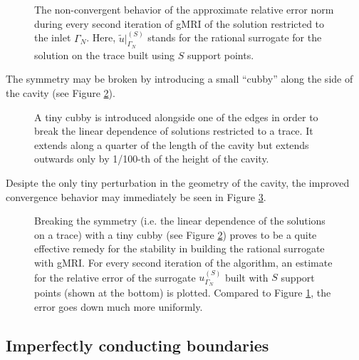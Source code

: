 \documentclass[11pt, a4paper]{article}
\begin{document}
\begin{figure}[ht]
    \centering
    
    \caption{The non-convergent behavior of the approximate relative error norm
    during every second iteration of \acrshort{gMRI} of the solution
    restricted to the inlet $\Gamma_N$. Here, $\tilde{u}|_{\Gamma_N}^{(S)}$ stands 
    for the rational surrogate for the solution on the trace built using $S$
    support points.}
    \label{fig:rectangular-cavity-trace-errornorm}
\end{figure}

The symmetry may be broken by introducing a small \enquote{cubby} along the side
of the cavity (see Figure \ref{fig:rectangular-cavity-cubby}). 

\begin{figure}[h]
    \centering
    
    \caption{A tiny cubby is introduced alongside one of the edges in order to
    break the linear dependence of solutions restricted to a trace. It extends
    along a quarter of the length of the cavity but extends outwards only by
    1/100-th of the height of the cavity.}
    \label{fig:rectangular-cavity-cubby}
\end{figure}

Desipte the only tiny perturbation in the geometry of the cavity, the improved
convergence behavior may immediately be seen in Figure \ref{fig:rectangular-cubby-trace-errornorm}.

\begin{figure}[ht]
    \centering
    
    \caption{Breaking the symmetry (i.e. the linear dependence of the solutions
    on a trace) with a tiny cubby (see Figure \ref{fig:rectangular-cavity-cubby})
    proves to be a quite effective remedy for the stability in building the
    rational surrogate with \acrshort{gMRI}. For every second iteration of the 
    algorithm, an estimate for the relative error of the surrogate $u_{\Gamma_N}^{(S)}$
    built with $S$ support points (shown at the bottom) is plotted. Compared to
    Figure \ref{fig:rectangular-cavity-trace-errornorm}, the error goes down much
    more uniformly.}
    \label{fig:rectangular-cubby-trace-errornorm}
\end{figure}

\clearpage
\subsection{Imperfectly conducting boundaries}
\label{subsec:examples-impedance}
\end{document}
